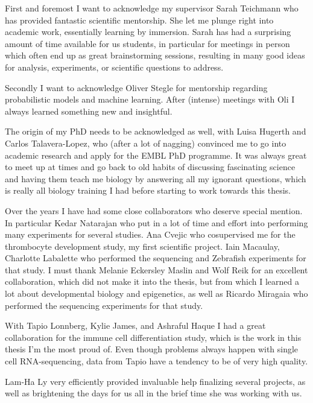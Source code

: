 
\begin{acknowledgements}      

First and foremost I want to acknowledge my supervisor Sarah Teichmann who has provided fantastic scientific mentorship. She let me plunge right into academic work, essentially learning by immersion. Sarah has had a surprising amount of time available for us students, in particular for meetings in person which often end up as great brainstorming sessions, resulting in many good ideas for analysis, experiments, or scientific questions to address.

Secondly I want to acknowledge Oliver Stegle for mentorship regarding probabilistic models and machine learning. After (intense) meetings with Oli I always learned something new and insightful.

The origin of my PhD needs to be acknowledged as well, with Luisa Hugerth and Carlos Talavera-Lopez, who (after a lot of nagging) convinced me to go into academic research and apply for the EMBL PhD programme. It was always great to meet up at times and go back to old habits of discussing fascinating science and having them teach me biology by answering all my ignorant questions, which is really all biology training I had before starting to work towards this thesis.

Over the years I have had some close collaborators who deserve special mention. In particular Kedar Natarajan who put in a lot of time and effort into performing many experiments for several studies. Ana Cvejic who cosupervised me for the thrombocyte development study, my first scientific project. Iain Macaulay, Charlotte Labalette who performed the sequencing and Zebrafish experiments for that study. I must thank Melanie Eckersley Maslin and Wolf Reik for an excellent collaboration, which did not make it into the thesis, but from which I learned a lot about developmental biology and epigenetics, as well as Ricardo Miragaia who performed the sequencing experiments for that study.

With Tapio Lonnberg, Kylie James, and Ashraful Haque I had a great collaboration for the immune cell differentiation study, which is the work in this thesis I'm the most proud of. Even though problems always happen with single cell RNA-sequencing, data from Tapio have a tendency to be of very high quality.

Lam-Ha Ly very efficiently provided invaluable help finalizing several projects, as well as brightening the days for us all in the brief time she was working with us.


\end{acknowledgements}
